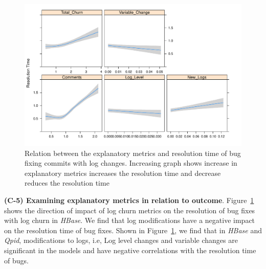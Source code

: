 \begin{figure}[t]
	\begin{minipage}{0.5\columnwidth}
		\hspace*{1.9cm}	\includegraphics[width=1.45\textwidth]{HbaseDirectionPlot}

	\end{minipage}
	\hspace*{1.cm}\caption{Relation between the explanatory metrics and resolution time of bug fixing commits with log changes. Increasing graph shows increase in explanatory metrics increases the resolution time and decrease reduces the resolution time \label{fig:HbaseDirectionPlot}}
\end{figure}






\textbf{(C-5) Examining explanatory metrics in relation to outcome}. Figure~\ref{fig:HbaseDirectionPlot} shows the direction of impact of log churn metrics on the resolution of bug fixes with log churn in \emph{HBase}. We find that log modifications have a negative impact on the resolution time of bug fixes. Shown in Figure~\ref{fig:HbaseDirectionPlot}, we find that in \emph{HBase} and \emph{Qpid}, modifications to logs, i.e, Log level changes and variable changes are significant in the models and have negative correlations with the resolution time of bugs. 

